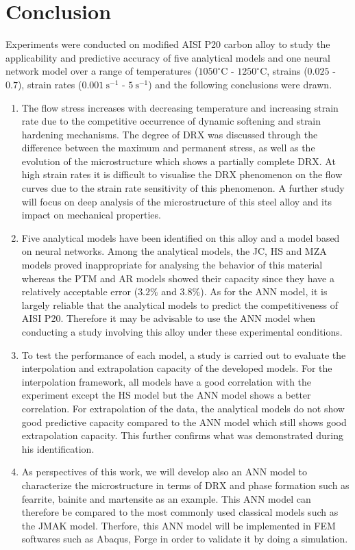 \documentclass[twoside,english,1p,final,sort&compress]{elsarticle}
\theoremstyle{plain}
\begin{document}
\FloatBarrier
\section{Conclusion \label{sec:Conclusion}}
Experiments were conducted on modified AISI P20 carbon alloy to study the applicability and predictive accuracy of five analytical models and one neural network model over a range of temperatures ($1050^\circ$C - $1250^\circ$C, strains ($0.025$ - $0.7$), strain rates ($0.001\ \text{s}^{-1}$ - $5\ \text{s}^{-1}$) and the following conclusions were drawn.
\begin{enumerate}
\item The flow stress increases with decreasing temperature and increasing strain rate due to the competitive occurrence of dynamic softening and strain hardening mechanisms.  The degree of DRX was discussed through the difference between the maximum and permanent stress, as well as the evolution of the microstructure which shows a partially complete DRX. At high strain rates it is difficult to visualise the DRX phenomenon on the flow curves due to the strain rate sensitivity of this phenomenon. A further study will focus on deep analysis of the microstructure of this steel alloy and its impact on mechanical properties.
\item Five analytical models have been identified on this alloy and a model based on neural networks. Among the analytical models, the JC, HS and MZA models proved inappropriate for analysing the behavior of this material whereas the PTM and AR models showed their capacity since they have a relatively acceptable error ($ 3.2 \% $ and $ 3.8 \%$). As for the ANN model, it is largely reliable that the analytical models to predict the competitiveness of AISI P20. Therefore it may be advisable to use the ANN model when conducting a study involving this alloy under these experimental conditions.
\item To test the performance of each model, a study is carried out to evaluate the interpolation and extrapolation capacity of the developed models. For the interpolation framework, all models have a good correlation with the experiment except the HS model but the ANN model shows a better correlation.  For extrapolation of the data, the analytical models do not show good predictive capacity compared to the ANN model which still shows good extrapolation capacity. This further confirms what was demonstrated during his identification.
\item As perspectives of this work, we will develop also an ANN model to characterize the microstructure in terms of DRX and phase formation such as fearrite, bainite and martensite as an example. This ANN model can therefore be compared to the most commonly used classical models such as the JMAK model. Therfore, this ANN model  will be implemented in FEM softwares such as Abaqus, Forge in order to validate it by doing a simulation.
\end{enumerate}


\end{document}
